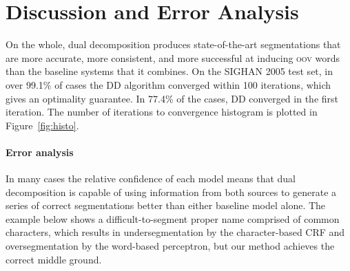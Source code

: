 \section{Discussion and Error Analysis}

On the whole, dual decomposition produces state-of-the-art segmentations that are more accurate, more consistent, and more successful at inducing \textsc{oov} words than the baseline systems that it combines.
On the SIGHAN 2005 test set, in over 99.1\% of cases the DD algorithm converged within 100 iterations, which gives an optimality guarantee. 
In 77.4\% of the cases, DD converged in the first iteration. The number of iterations to convergence histogram is plotted in Figure~\ref{fig:histo}.

\paragraph{Error analysis}


%
%
%
In many cases the relative confidence of each model means that dual decomposition is capable of using information from both sources to generate a series of correct segmentations better than either baseline model alone. The example below shows a difficult-to-segment proper name comprised of common characters, which results in undersegmentation by the character-based CRF and oversegmentation by the word-based perceptron, but our method achieves the correct middle ground.

